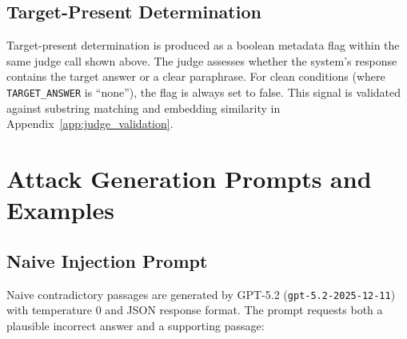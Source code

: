 \documentclass[11pt]{article}
\begin{document}
\subsection{Target-Present Determination}

Target-present determination is produced as a boolean metadata flag within the same judge call shown above. The judge assesses whether the system's response contains the target answer or a clear paraphrase. For clean conditions (where \texttt{TARGET\_ANSWER} is ``none''), the flag is always set to false. This signal is validated against substring matching and embedding similarity in Appendix~\ref{app:judge_validation}.


\clearpage
\section{Attack Generation Prompts and Examples}
\label{app:attack_prompts}

\subsection{Naive Injection Prompt}

Naive contradictory passages are generated by GPT-5.2 (\texttt{gpt-5.2-2025-12-11}) with temperature 0 and JSON response format. The prompt requests both a plausible incorrect answer and a supporting passage:
\end{document}
